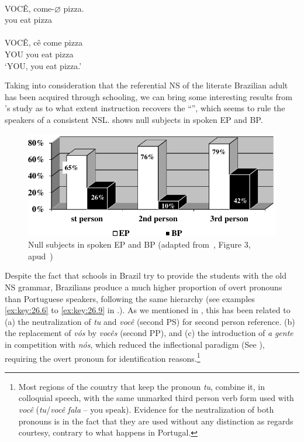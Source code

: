 \documentclass[output=paper]{langsci/langscibook}
\begin{document}
\ea%
    \label{ex:key:26.18}
    \ea {}\\
    \gll    VOCÊ,   come-${\varnothing}$ pizza.\\
            you      eat      pizza\\
    \ex {}\\
	\gll	VOCÊ,   cê    come pizza\\
			YOU    you  eat pizza\\
	\glt	\enquote*{YOU, you eat pizza.}
    \z
\z

Taking into consideration that the referential NS of the literate Brazilian
adult has been acquired through schooling, we can bring some interesting
results from \citeauthor{BarbosaDuarteKato2005}’s study as to what extent
instruction recovers the “”, which seems to rule the
speakers of a consistent \gls{NSL}.
 shows null subjects in spoken \gls{EP} and \gls{BP}.\largerpage[-2]

\begin{figure}[htpb]
    \centering
    \includegraphics[width=0.75\linewidth]{./img/fig2.pdf}
    \caption{Null subjects in spoken \gls{EP} and \gls{BP} (adapted
    from~\citealt{BarbosaDuarteKato2005}, Figure 3,
apud~\citealt{Duarte2004})}\label{fig:key:26.2}
\end{figure}

Despite the fact that schools in Brazil try to
provide the students with the old NS grammar, Brazilians produce a much higher
proportion of overt pronouns than Portuguese speakers, following the same
hierarchy (see examples \eqref{ex:key:26.6} to \eqref{ex:key:26.9} in
.). As we mentioned in , this has
been related to (a) the neutralization of \emph{tu} and \emph{você} (second PS)
for second person reference. (b) the replacement of \emph{vós} by \emph{vocês}
(second PP), and (c) the introduction of \emph{a} \emph{gente}  in competition
with \emph{nós}, which reduced the inflectional paradigm (See
), requiring the overt pronoun for identification
reasons.\footnote{Most regions of the country that keep the pronoun \emph{tu},
    combine it, in colloquial speech, with the same unmarked third person verb
    form used with \emph{você} (\emph{tu}/\emph{você} \emph{fala} – you speak).
    Evidence for the neutralization of both pronouns is in the fact that they
    are used without any distinction as regards courtesy, contrary to what
happens in Portugal.}
\end{document}
